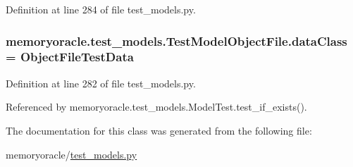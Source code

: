 Definition at line 284 of file test\+\_\+models.\+py.

\hypertarget{classmemoryoracle_1_1test__models_1_1TestModelObjectFile_a6b77eed80588c6a6c9bde6b21f999b62}{}
\subsubsection[{data\+Class}]{\setlength{\rightskip}{0pt plus 5cm}memoryoracle.\+test\+\_\+models.\+Test\+Model\+Object\+File.\+data\+Class = {\bf Object\+File\+Test\+Data}\hspace{0.3cm}{\ttfamily [static]}}\label{classmemoryoracle_1_1test__models_1_1TestModelObjectFile_a6b77eed80588c6a6c9bde6b21f999b62}


Definition at line 282 of file test\+\_\+models.\+py.



Referenced by memoryoracle.\+test\+\_\+models.\+Model\+Test.\+test\+\_\+if\+\_\+exists().



The documentation for this class was generated from the following file\+:\begin{DoxyCompactItemize}
\item 
memoryoracle/\hyperlink{test__models_8py}{test\+\_\+models.\+py}\end{DoxyCompactItemize}
